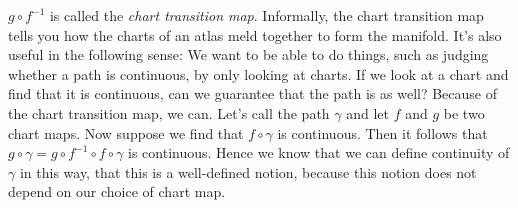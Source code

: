 $g\circ f^{-1}$ is called the {\it chart transition map}.
Informally, the chart transition map tells you how the charts of an atlas meld
together to form the manifold. It's also useful in the following sense: We
want to be able to do things, such as judging whether a path is continuous, by
only looking at charts. If we look at a chart and find that it is continuous,
can we guarantee that the path is as well? Because of the chart transition
map, we can. Let's call the path $\gamma$ and let $f$ and $g$ be two chart
maps. Now suppose we find that $f\circ\gamma$ is continuous. Then it follows
that $g\circ\gamma=g\circ f^{-1}\circ f\circ\gamma$ is continuous. Hence we 
know that we can define continuity of $\gamma$ in this way, that this is a
well-defined notion, because this notion does not depend on our choice of
chart map.

